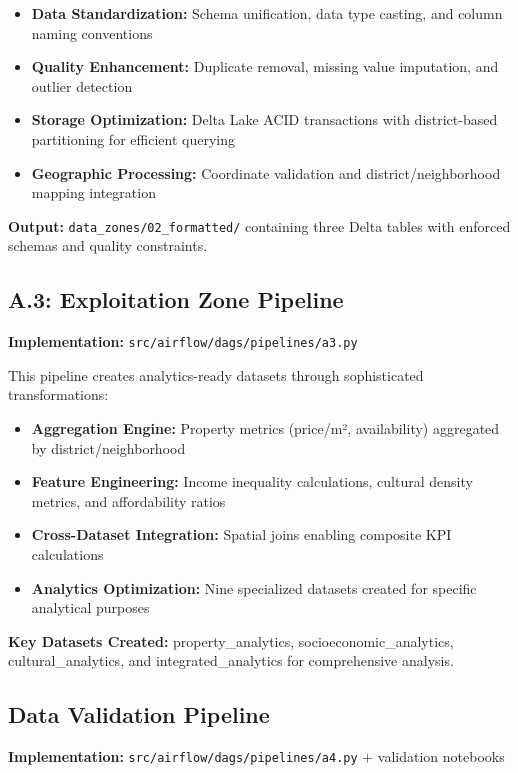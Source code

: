 \begin{itemize}[nosep]
\item \textbf{Data Standardization:} Schema unification, data type casting, and column naming conventions
\item \textbf{Quality Enhancement:} Duplicate removal, missing value imputation, and outlier detection
\item \textbf{Storage Optimization:} Delta Lake ACID transactions with district-based partitioning for efficient querying
\item \textbf{Geographic Processing:} Coordinate validation and district/neighborhood mapping integration
\end{itemize}

\textbf{Output:} \texttt{data\_zones/02\_formatted/} containing three Delta tables with enforced schemas and quality constraints.

\subsection{A.3: Exploitation Zone Pipeline}

\textbf{Implementation:} \texttt{src/airflow/dags/pipelines/a3.py}

This pipeline creates analytics-ready datasets through sophisticated transformations:

\begin{itemize}[nosep]
\item \textbf{Aggregation Engine:} Property metrics (price/m², availability) aggregated by district/neighborhood
\item \textbf{Feature Engineering:} Income inequality calculations, cultural density metrics, and affordability ratios
\item \textbf{Cross-Dataset Integration:} Spatial joins enabling composite KPI calculations
\item \textbf{Analytics Optimization:} Nine specialized datasets created for specific analytical purposes
\end{itemize}

\textbf{Key Datasets Created:} property\_analytics, socioeconomic\_analytics, cultural\_analytics, and integrated\_analytics for comprehensive analysis.

\subsection{Data Validation Pipeline}

\textbf{Implementation:} \texttt{src/airflow/dags/pipelines/a4.py} + validation notebooks

